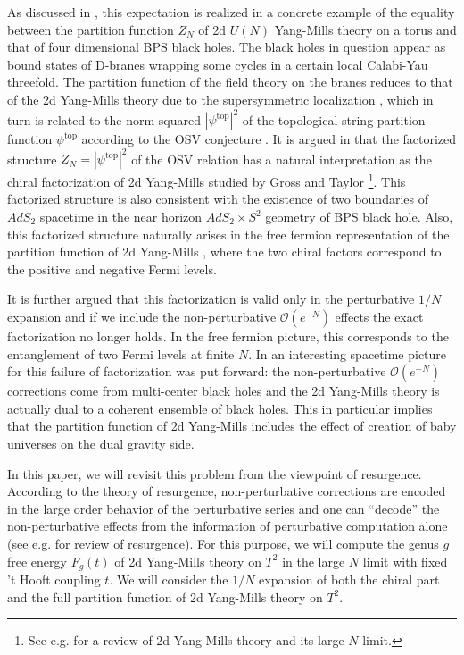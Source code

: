 \documentclass[11pt]{article}
\renewcommand{\[}{\begin{eqnarray}}
\renewcommand{\]}{\end{eqnarray}}
\begin{document}
As discussed in \cite{Vafa:2004qa}, this expectation is realized in a concrete example
of the equality between
the partition function $Z_N$ of 2d $U(N)$ Yang-Mills theory on a torus and that of four dimensional
BPS black holes. The black holes in question appear as bound states of D-branes
wrapping some cycles in a certain local Calabi-Yau threefold.
The partition function of the field theory on the branes
reduces to that of the 2d Yang-Mills theory due to the supersymmetric localization 
\cite{Vafa:2004qa}, which in turn is related to
the norm-squared $|\psi^{\text{top}}|^2$ of the topological string partition function 
$\psi^{\text{top}}$ according to the OSV conjecture \cite{Ooguri:2004zv}. 
It is argued in \cite{Vafa:2004qa} that 
the factorized structure $Z_N=|\psi^{\text{top}}|^2$ of the OSV relation has a natural
interpretation as the chiral factorization of
2d Yang-Mills  studied 
by Gross and Taylor \cite{Gross:1992tu,Gross:1993hu,Gross:1993yt}\footnote{See e.g. \cite{Moore:1994dk,Cordes:1994fc} for a review of 2d Yang-Mills theory and its large $N$ limit.}.
This factorized structure is also consistent with 
the existence of two boundaries of $AdS_2$ spacetime
in the near horizon $AdS_2\times S^2$ geometry of BPS black hole. 
Also, this factorized structure
naturally arises in the
free fermion representation of the partition function 
of 2d Yang-Mills \cite{Minahan:1993np}, where the two chiral factors
correspond to the positive and negative Fermi levels. 

It is further argued \cite{Vafa:2004qa} that this factorization is 
valid only in the perturbative $1/N$ expansion and if we include the non-perturbative
$\mathcal{O}(e^{-N})$ effects the exact factorization no longer holds.
In the free fermion picture, this corresponds to the entanglement of 
two Fermi levels at finite $N$.
In \cite{Dijkgraaf:2005bp} an interesting spacetime picture for this failure of factorization
was put forward:
the non-perturbative
$\mathcal{O}(e^{-N})$ corrections come from multi-center black holes
and the 2d Yang-Mills theory is actually dual to a coherent ensemble of black holes. This 
in particular implies that
the partition function of 2d Yang-Mills includes the effect of creation of baby universes
on the dual gravity side.



In this paper, we will revisit this problem from the viewpoint of resurgence. 
According to the theory of resurgence, 
non-perturbative corrections are encoded in the 
large order behavior of the perturbative series and one can 
``decode'' the non-perturbative effects from the information 
of perturbative computation alone (see e.g. \cite{Aniceto:2018bis,Dunne:2015eaa,Marino:2012zq} 
for review of resurgence).
For this purpose, we will compute the genus $g$ free energy $F_g(t)$ 
of 2d Yang-Mills theory on $T^2$ in the large $N$ limit with fixed 't Hooft coupling $t$. 
We will consider the $1/N$ expansion of both the chiral part and the full partition function 
of 2d Yang-Mills theory on $T^2$.
\end{document}
